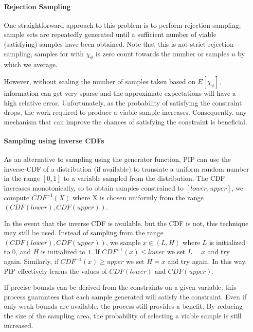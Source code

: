 \paragraph{Rejection Sampling}
One straightforward approach to this problem is to perform rejection sampling; sample sets are repeatedly generated until a sufficient number of viable (satisfying) samples have been obtained.  Note that this is not strict rejection sampling, samples for with $\chi_{\phi}$ is zero count towards the number or samples $n$ by which we average.  

However, without scaling the number of samples taken based on $E[\chi_\phi]$, information can get very sparse and the approximate expectations will have a high relative error.  Unfortunately, as the probability of satisfying the constraint drops, the work required to produce a viable sample increases.   Consequently, any mechanism that can improve the chances of satisfying the constraint is beneficial.

\paragraph{Sampling using inverse CDFs}
\label{subsec:icdf}
As an alternative to sampling using the generator function, PIP can use the inverse-CDF of a distribution (if available) to translate a uniform random number in the range $[0,1]$ to a variable sampled from the distribution.  The CDF increases monotonically, so to obtain samples constrained to $[lower, upper]$, we compute $CDF^{-1}(X)$ where X is chosen uniformly  from the range $(CDF(lower), CDF(upper))$.   

In the event that the inverse CDF is available, but the CDF is not, this technique may still be used.  Instead of sampling from the range $(CDF(lower), CDF(upper))$, we sample $x \in (L,H)$ where $L$ is initialized to $0$, and $H$ is initialized to $1$.  If $CDF^{-1}(x) \leq lower$ we set $L = x$ and try again.  Similarly, if $CDF^{-1}(x)  \geq upper$ we set $H = x$ and try again.   In this way, PIP effectively learns the values of $CDF(lower)$ and $CDF(upper)$.  

If precise bounds can be derived from the constraints on a given variable, this process guarantees that each sample generated will satisfy the constraint.  Even if only weak bounds are available, the process still provides a benefit.  By reducing the size of the sampling area, the probability of selecting a viable sample is still increased.  

